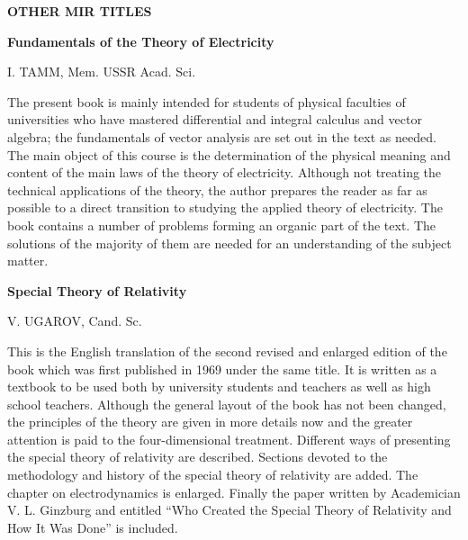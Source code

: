 


\vspace*{-12pt}

{\Large{\sffamily\bfseries OTHER MIR TITLES}}

\bigskip
\bigskip
\bigskip

\noindent
\textbf{Fundamentals of the Theory of Electricity}

\noindent
I. TAMM, Mem. USSR Acad. Sci.

\noindent
The present book is mainly intended for students of physical faculties of universities who have mastered differential and integral calculus and vector algebra; the fundamentals of vector analysis are set out in the text as needed. The main object of this course is the determination of the physical meaning and content of the main laws of the theory of electricity. Although not treating the technical applications of the theory, the author prepares the reader as far as possible to a direct transition to studying the applied theory of electricity. The book contains a number of problems forming an organic part of the text. The solutions of the majority of them are needed for an understanding of the subject matter.

\bigskip
\bigskip
\bigskip

\noindent
\textbf{Special Theory of Relativity}

\noindent
V. UGAROV, Cand. Sc.

\noindent
This is the English translation of the second revised and enlarged edition of the book which was first published in 1969 under the same title. It is written as a textbook to be used both by university students and teachers as well as high school teachers. Although the general layout of the book has not been changed, the principles of the theory are given in more details now and the greater attention is paid to the four-dimensional treatment. Different ways of presenting the special theory of relativity are described. Sections devoted to the methodology and history of the special theory of relativity are added. The chapter on electrodynamics is enlarged. Finally the paper written by Academician V. L. Ginzburg and entitled ``Who Created the Special Theory of Relativity and How It Was Done'' is included.


